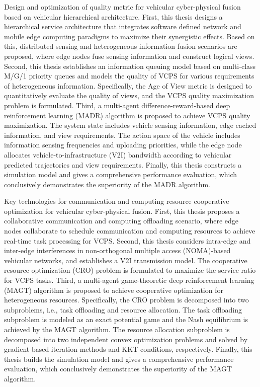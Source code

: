 \begin{eabstract}
 Design and optimization of quality metric for vehicular cyber-physical fusion based on vehicular hierarchical architecture. First, this thesis designs a hierarchical service architecture that integrates software defined network and mobile edge computing paradigms to maximize their synergistic effects. Based on this, distributed sensing and heterogeneous information fusion scenarios are proposed, where edge nodes fuse sensing information and construct logical views. Second, this thesis establishes an information queuing model based on multi-class M/G/1 priority queues and models the quality of VCPS for various requirements of heterogeneous information. Specifically, the Age of View metric is designed to quantitatively evaluate the quality of views, and the VCPS quality maximization problem is formulated. Third, a multi-agent difference-reward-based deep reinforcement learning (MADR) algorithm is proposed to achieve VCPS quality maximization. The system state includes vehicle sensing information, edge cached information, and view requirements. The action space of the vehicle includes information sensing frequencies and uploading priorities, while the edge node allocates vehicle-to-infrastructure (V2I) bandwidth according to vehicular predicted trajectories and view requirements. Finally, this thesis constructs a simulation model and gives a comprehensive performance evaluation, which conclusively demonstrates the superiority of the MADR algorithm.

 Key technologies for communication and computing resource cooperative optimization for vehicular cyber-physical fusion. First, this thesis proposes a collaborative communication and computing offloading scenario, where edge nodes collaborate to schedule communication and computing resources to achieve real-time task processing for VCPS. Second, this thesis considers intra-edge and inter-edge interferences in non-orthogonal multiple access (NOMA)-based vehicular networks, and establishes a V2I transmission model. The cooperative resource optimization (CRO) problem is formulated to maximize the service ratio for VCPS tasks. Third, a multi-agent game-theoretic deep reinforcement learning (MAGT) algorithm is proposed to achieve cooperative optimization for heterogeneous resources. Specifically, the CRO problem is decomposed into two subproblems, i.e., task offloading and resource allocation. The task offloading subproblem is modeled as an exact potential game and the Nash equilibrium is achieved by the MAGT algorithm. The resource allocation subproblem is decomposed into two independent convex optimization problems and solved by gradient-based iteration methods and KKT conditions, respectively. Finally, this thesis builds the simulation model and gives a comprehensive performance evaluation, which conclusively demonstrates the superiority of the MAGT algorithm.


\end{eabstract}
